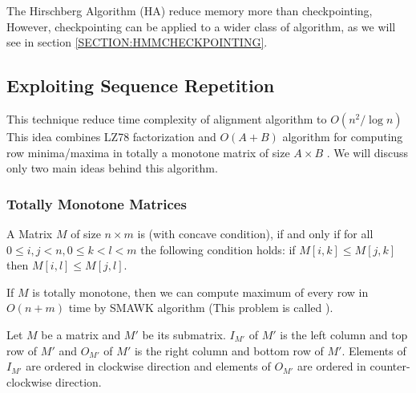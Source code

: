 The Hirschberg Algorithm (HA) reduce memory more than checkpointing, 
However, checkpointing can be applied to a wider class of algorithm, as we will
see in section \ref{SECTION:HMMCHECKPOINTING}.



\subsection{Exploiting Sequence Repetition}

This technique reduce time complexity of alignment algorithm to $O(n^2/\log n)$
This idea combines LZ78 factorization \cite{Lempel1976} and
$O(A+B)$ algorithm for computing row minima/maxima in totally a monotone matrix of
size $A\times B$ \cite{Aggarwal1987}. We will discuss only two main ideas behind
this algorithm. 

\subsubsection{Totally Monotone Matrices}

\begin{definition}\cite{Crochemore2002}
A Matrix $M$ of size $n\times m$ is  (with concave condition),
if and only if for all $0\leq i,j< n, 0\leq k<l<m$ the following condition holds:
if $M[i,k]\leq M[j,k]$ then $M[i,l]\leq M[j,l]$.
\end{definition}

If $M$ is totally monotone, then we can compute maximum of every row 
in $O(n+m)$ time by SMAWK algorithm \cite{Aggarwal1987} (This problem is called
).

\begin{definition}\cite{Crochemore2002}
Let $M$ be a matrix and $M'$ be its
submatrix.  $I_{M'}$ of $M'$ is the left column and top
row of $M'$ and  $O_{M'}$ of $M'$ is the right column and
bottom row of $M'$. Elements of $I_{M'}$ are ordered in clockwise direction
and elements of $O_{M'}$ are ordered in counter-clockwise direction.
\end{definition}

